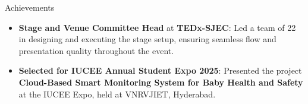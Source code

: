 \documentclass{resume} %
\begin{document}
\begin{rSection}{Achievements} 
    \begin{itemize}
        \item \textbf{Stage and Venue Committee Head} at \textbf{TEDx-SJEC}: Led a team of 22 in designing and executing the stage setup, ensuring seamless flow and presentation quality throughout the event.
        \item \textbf{Selected for IUCEE Annual Student Expo 2025}: Presented the project \textbf{Cloud-Based Smart Monitoring System for Baby Health and Safety} at the IUCEE Expo, held at VNRVJIET, Hyderabad.    
    \end{itemize}
\end{rSection}
\end{document}

